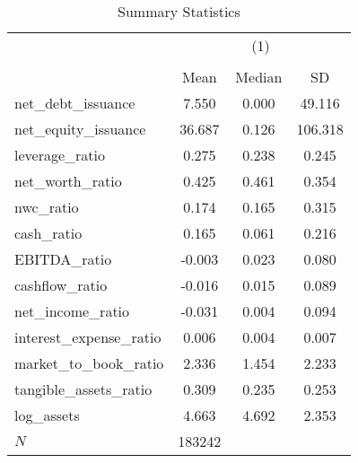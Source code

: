 \begin{table}[htbp]\centering
\def\sym#1{\ifmmode^{#1}\else\(^{#1}\)\fi}
\caption{Summary Statistics}
\begin{tabular}{l*{1}{ccc}}
\hline\hline
            &\multicolumn{3}{c}{(1)}               \\
            &\multicolumn{3}{c}{}                  \\
            &        Mean&      Median&          SD\\
\hline
net\_debt\_issuance&       7.550&       0.000&      49.116\\
net\_equity\_issuance&      36.687&       0.126&     106.318\\
leverage\_ratio&       0.275&       0.238&       0.245\\
net\_worth\_ratio&       0.425&       0.461&       0.354\\
nwc\_ratio   &       0.174&       0.165&       0.315\\
cash\_ratio  &       0.165&       0.061&       0.216\\
EBITDA\_ratio&      -0.003&       0.023&       0.080\\
cashflow\_ratio&      -0.016&       0.015&       0.089\\
net\_income\_ratio&      -0.031&       0.004&       0.094\\
interest\_expense\_ratio&       0.006&       0.004&       0.007\\
market\_to\_book\_ratio&       2.336&       1.454&       2.233\\
tangible\_assets\_ratio&       0.309&       0.235&       0.253\\
log\_assets  &       4.663&       4.692&       2.353\\
\hline
\(N\)       &      183242&            &            \\
\hline\hline
\end{tabular}
\end{table}

